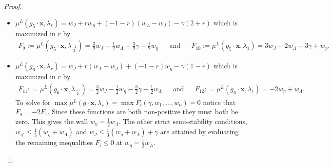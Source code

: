 \documentclass{amsart}
\numberwithin{equation}{section}
\theoremstyle{definition}
\begin{document}
\begin{proof}
\begin{itemize}
    
    \item $\mu^L(g_5 \cdot \mathbf{x}, \lambda_r) = w_J + r w_\eta + (-1-r)(w_\Lambda - w_J) - \gamma (2+r)$
     which is maximized in $r$ by
     \begin{align*}
         F_9:= \mu^L(g_5 \cdot \mathbf{x}, \lambda_{\frac{-1}{2}}) = \frac{3}{2}w_J - \frac{1}{2}w_\Lambda - \frac{3}{2} \gamma - \frac{1}{2}w_\eta
         && \text{and} &&
         F_{10} := \mu^L(g_5 \cdot \mathbf{x}, \lambda_1) = 3 w_J - 2w_\Lambda -3\gamma + w_\eta.
     \end{align*}
    
    \item $\mu^L(g_6 \cdot \mathbf{x}, \lambda_r) = w_J + r(w_\Lambda - w_J) + (-1-r)w_\eta - \gamma(1-r) $
    which is maximized in $r$ by
    \begin{align*}
        F_{11} : = \mu^L(g_6 \cdot \mathbf{x}, \lambda_{\frac{-1}{2}}) = \frac{3}{2}w_J - \frac{1}{2}w_\eta - \frac{3}{2}\gamma - \frac{1}{2}w_{\Lambda}
        && \text{and} &&
           F_{12} : = \mu^L(g_6 \cdot \mathbf{x}, \lambda_1) = - 2w_\eta + w_\Lambda .
    \end{align*}
To solve for $\max \mu^L(g \cdot \mathbf{x}, \lambda_r) = \max F_i(\gamma, w_1 , \dots , w_n) = 0$ notice that $F_8 = -2 F_{1}$. Since these functions are both non-positive they must both be zero. This gives the wall $w_\eta = \frac{1}{2}w_\Lambda$. The other strict semi-stability conditions, $w_{\eta'} \leq \frac{1}{3} (w_{\eta} + w_\Lambda)$ and $w_J \leq \frac{1}{3} (w_\eta + w_\Lambda) + \gamma$ are attained by evaluating the remaining inequalities $F_i \leq 0$ at $w_\eta = \frac{1}{2}w_\Lambda$.
\end{itemize}










\end{proof}
\end{document}
